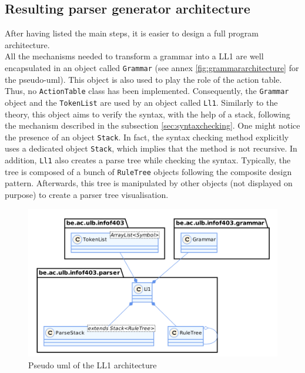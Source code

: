 \documentclass[a4paper,11pt]{article}
\begin{document}
  \subsection{Resulting parser generator architecture}
    \label{sec:resulting_parser}
    After having listed the main steps, it is easier to design a full program architecture.\\
    All the mechanisms needed to transform a grammar into a LL1 are well encapsulated in an object called \verb|Grammar| (see annex \ref{fig:grammararchitecture} for the pseudo-uml). This object is also used to play the role of the action table. Thus, no \verb|ActionTable| class has been implemented. Consequently, the \verb|Grammar| object and the \verb|TokenList| are used by an object called \verb|Ll1|. Similarly to the theory, this object aims to verify the syntax, with the help of a stack, following the mechanism described in the subsection \ref{sec:syntaxchecking}. One might notice the presence of an object \verb|Stack|. In fact, the syntax checking method explicitly uses a dedicated object \verb|Stack|, which implies that the method is not recursive. In addition, \verb|Ll1| also creates a parse tree while checking the syntax. Typically, the tree is composed of a bunch of \verb|RuleTree| objects following the composite design pattern. Afterwards, this tree is manipulated by other objects (not displayed on purpose) to create a parser tree visualisation.
    \begin{figure}[h!]
      \centering
      \includegraphics[scale=0.275]{./img/class_ll1.png}
      \caption{Pseudo uml of the LL1 architecture}
      \label{fig:architecturell1}
    \end{figure}
  
\end{document}
